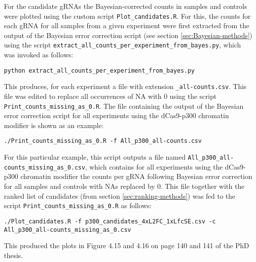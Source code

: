 For the candidate gRNAs the Bayesian-corrected counts in samples and controls were plotted using the custom script \verb|Plot_candidates.R|. For this, the counts for each gRNA for all samples from a given experiment were first extracted from the output of the Bayesian error correction script (see section \ref{sec:Bayesian-methods}) using the script 
\verb|extract_all_counts_per_experiment_from_bayes.py|, which was invoked as follows:

\begin{small}\begin{lstlisting}
python extract_all_counts_per_experiment_from_bayes.py
\end{lstlisting}\end{small}

This produces, for each experiment a file with extension \verb|_all-counts.csv|. This file was edited to replace all occurrences of NA with 0 using the script \newline
\verb|Print_counts_missing_as_0.R|. The file containing the output of the Bayesian error correction script for all experiments using the dCas9-p300 chromatin modifier is shown as an example: 

\begin{small}\begin{lstlisting}
./Print_counts_missing_as_0.R -f All_p300_all-counts.csv
\end{lstlisting}\end{small}

For this particular example, this script outputs a file named \newline
\verb|All_p300_all-counts_missing_as_0.csv|, which contains for all experiments using the dCas9-p300 chromatin modifier the counts per gRNA following Bayesian error correction for all samples and controls with NAs replaced by 0. This file together with the ranked list of candidates (from section \ref{sec:ranking-methods}) was fed to the script \verb|Print_counts_missing_as_0.R| as follows:

\begin{small}\begin{lstlisting}
./Plot_candidates.R -f p300_candidates_4xL2FC_1xLfcSE.csv -c All_p300_all-counts_missing_as_0.csv
\end{lstlisting}\end{small}

This produced the plots in Figure 4.15 and 4.16 on page 140 and 141 of the PhD thesis.